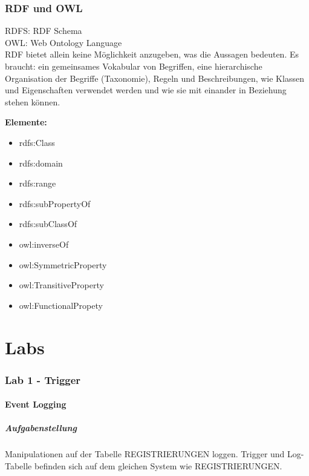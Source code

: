 \documentclass[a4paper,10pt,titlepage=false]{scrreprt}
\begin{document}
\section{RDF und OWL} %
\label{sec:rdf_und_owl}
RDFS: RDF Schema\\
OWL: Web Ontology Language\\
RDF bietet allein keine Möglichkeit anzugeben, was
die Aussagen bedeuten.
Es braucht:
ein gemeinsames Vokabular von Begriffen,
eine hierarchische Organisation der Begriffe
(Taxonomie),
Regeln und Beschreibungen, wie Klassen und
Eigenschaften verwendet werden und wie sie mit
einander in Beziehung stehen können.

\textbf{Elemente:}

\begin{itemize}
  \item rdfs:Class
\item rdfs:domain
\item rdfs:range
\item rdfs:subPropertyOf
\item rdfs:subClassOf
\item owl:inverseOf
\item owl:SymmetricProperty
\item owl:TransitiveProperty
\item owl:FunctionalPropety

\end{itemize}

\part{Labs} %
\label{prt:labs_}
\section{Lab 1 - Trigger}
\subsection{Event Logging}
\subsubsection{Aufgabenstellung}
Manipulationen auf der Tabelle REGISTRIERUNGEN loggen. Trigger und Log-Tabelle befinden sich auf dem gleichen System wie REGISTRIERUNGEN.\\
\end{document}

